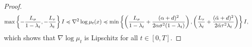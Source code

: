 \begin{proof}
\begin{equation*}
    \max\left\{-\frac{L_\sigma}{1-\lambda_t}, -\frac{L_\tau}{\lambda_t}\right\}I \preccurlyeq \nabla^2\log\mu_t(x) \preccurlyeq \min\left\{ \left(\frac{L_\sigma}{1-\lambda_t}+ \frac{(\alpha + d)^2}{2\alpha\sigma^2(1-\lambda_t)}\right) ,\left(\frac{L_\tau}{\lambda_t}+ \frac{(\Tilde{\alpha} + d)^2}{2\Tilde{\alpha}\tau^2\lambda_t}\right) \right\}I,
\end{equation*}
which shows that $\nabla\log\mu_t$ is Lipschitz for all $t\in[0, T]$.
\end{proof}